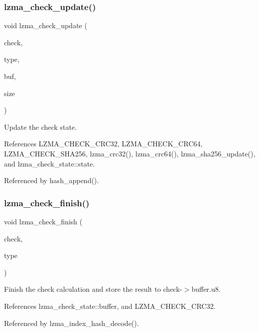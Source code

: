 \mbox{\label{check_8c_aa5e9d54e127d31eda8e4f31cbe69e150}} 
\subsubsection{lzma\+\_\+check\+\_\+update()}
{\footnotesize\ttfamily void lzma\+\_\+check\+\_\+update (\begin{DoxyParamCaption}\item[{\textbf{ lzma\+\_\+check\+\_\+state} $\ast$}]{check,  }\item[{\textbf{ lzma\+\_\+check}}]{type,  }\item[{const uint8\+\_\+t $\ast$}]{buf,  }\item[{size\+\_\+t}]{size }\end{DoxyParamCaption})}



Update the check state. 



References L\+Z\+M\+A\+\_\+\+C\+H\+E\+C\+K\+\_\+\+C\+R\+C32, L\+Z\+M\+A\+\_\+\+C\+H\+E\+C\+K\+\_\+\+C\+R\+C64, L\+Z\+M\+A\+\_\+\+C\+H\+E\+C\+K\+\_\+\+S\+H\+A256, lzma\+\_\+crc32(), lzma\+\_\+crc64(), lzma\+\_\+sha256\+\_\+update(), and lzma\+\_\+check\+\_\+state\+::state.



Referenced by hash\+\_\+append().

\mbox{\label{check_8c_a682bfef0e2be646de63dbcba0eb6a33e}} 
\subsubsection{lzma\+\_\+check\+\_\+finish()}
{\footnotesize\ttfamily void lzma\+\_\+check\+\_\+finish (\begin{DoxyParamCaption}\item[{\textbf{ lzma\+\_\+check\+\_\+state} $\ast$}]{check,  }\item[{\textbf{ lzma\+\_\+check}}]{type }\end{DoxyParamCaption})}



Finish the check calculation and store the result to check-\/$>$buffer.\+u8. 



References lzma\+\_\+check\+\_\+state\+::buffer, and L\+Z\+M\+A\+\_\+\+C\+H\+E\+C\+K\+\_\+\+C\+R\+C32.



Referenced by lzma\+\_\+index\+\_\+hash\+\_\+decode().

